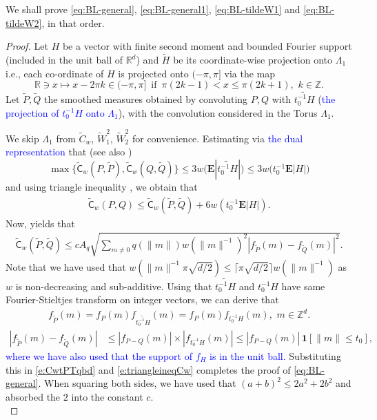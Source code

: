 \documentclass[12pt]{article}
\newcommand{\tC}{ \widetilde{\mathsf C}}
\newcommand{\R}{\mathbb{R}}
\newcommand{\Z}{\mathbb{Z}}
\newcommand{\1}{\mathbf{1}}
\newcommand{\dy}[1]{\textcolor{blue}{#1}}
\newcommand{\dy}[1]{#1}%
\begin{document}
{{{{{We shall prove \eqref{eq:BL-general}, \eqref{eq:BL-general1}, \eqref{eq:BL-tildeW1} and \eqref{eq:BL-tildeW2}, in that order. 
%
\begin{proof}
Let $H$ be a vector with finite second moment and bounded Fourier support (included in the {unit ball of $\R^d$}) and $\tilde{H}$ be its coordinate-wise projection onto $\Lambda_1$ i.e., each co-ordinate of $H$ is projected onto $(-\pi,\pi]$ via the map
%
$$ \R \ni x \mapsto x - 2\pi k \in (-\pi,\pi] \, \, \, \text{if} \, \, \, \pi(2k-1) < x  \leqslant \pi (2k+1), \, \, k \in \Z.$$
%
Let $ \tilde P ,\tilde Q $ the smoothed measures obtained by convoluting $ P ,Q $ with $ \widetilde{t_0^{-1} H}$ (\dy{the projection of $t_0^{-1}H$ onto $\Lambda_1$}), with the convolution considered in the Torus $\Lambda_1$.

We skip $\Lambda_1$ from $\tilde{C}_w$, $\tilde{W}^2_1$, $\tilde{W}^2_2$ for convenience. Estimating via \dy{the dual representation} that (see also \cite[(7.3)]{bobkov2020transport})
%
$$ \max\{\tC_{w}(P,\tilde P),\tC_{w}(Q,\tilde Q)\}  \leqslant {3 w\big( \mathbf{E}| \widetilde{t_0^{-1} H}| \big)  \leqslant 3 w\big( t_0^{-1}\mathbf{E}|H| \big)}$$
%
and using triangle inequality %
, we obtain that
\begin{align}
\label{e:triangleineqCw}
\tC_{w}(P ,Q )\leqslant  \tC_{w}(\tilde P ,\tilde Q )+ 6w(t_0^{-1}\mathbf{E} | H | ).
\end{align}
%
Now, \cite[(4)]{bobkov2024correction} yields that
\begin{align}
\label{e:CwtPTqbd}
\tC_{w}(\tilde P ,\tilde Q )\leqslant cA_q\sqrt{\sum_{m\neq 0}q(\|m\|)w(\|m\|^{-1} )^{2} | f_{ \tilde 	P }(m)-f_{ \tilde 	Q }(m) | ^{2}}.
\end{align}
%
{Note that we have used that $w(\|m\|^{-1}\pi\sqrt{d/2})  \leqslant \lceil \pi\sqrt{d/2} \rceil w(\|m\|^{-1})$ as $w$ is non-decreasing and sub-additive.} Using that $\widetilde{t_0^{-1} H}$ and $t_0^{-1}H$ have same Fourier-Stieltjes transform on integer vectors, we can derive that
%
\begin{align*}
 f_{ \tilde P }(m)  = f_{ P }(m)f_{\widetilde{t_0^{-1} H}}(m) = f_{ P }(m)f_{t_0^{-1}H}(m), \, \, m \in \Z^d.
\end{align*}
%
%
\begin{align}
\label{e:fouriertPtQ}
| f_{ \tilde 	P }(m)-f_{ \tilde 	Q }(m) | & \leqslant |f_{ P - Q }(m)| \times |f_{t_0^{-1}H}(m)| \leqslant   |f_{ P - Q }(m)| \, {\1[\|m\|  \leqslant t_0]},
\end{align}
%
\dy{where we have also used that the support of $f_H$ is in the unit ball.}{ Substituting this in \eqref{e:CwtPTqbd} and \eqref{e:triangleineqCw} completes the proof of \eqref{eq:BL-general}. When squaring both sides, we have used that $(a+b)^2  \leqslant 2a^2 + 2b^2$ and absorbed the $2$ into the constant $c$.} \\


\end{proof}}}}}}
\end{document}
